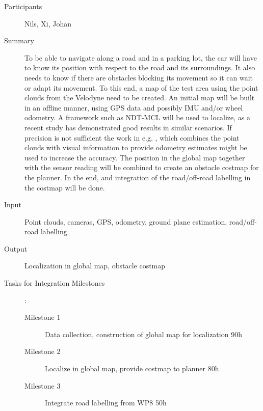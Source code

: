 \documentclass[11pt,a4paper]{article}
\begin{document}
\begin{description}
\item[Participants] Nils, Xi, Johan
\item[Summary] To be able to navigate along a road and in a parking lot, the car will have to know its 
			   position with respect to the road and its surroundings. It also needs to know if there
			   are obstacles blocking its movement so it can wait or adapt its movement.
			   To this end, a map of the test area using the point clouds from the
			   Velodyne need to be created. An initial map will be built in an offline manner, using GPS data and possibly
			   IMU and/or wheel odometry. A framework such as NDT-MCL \cite{saarinen2013normal} 
			   will be used to localize, as a recent study \cite{magnusson2015beyond} has demonstrated good results
			   in similar scenarios. If precision is not sufficient the work in e.g. \cite{Zhang_DEMO},
			   which combines the point clouds with visual information to provide odometry estimates might be used to increase the accuracy.
			   The position in the global map together
			   with the sensor reading will be combined to create an obstacle costmap for the planner.
			   In the end, and integration of the road/off-road labelling in the costmap will be done.
				
\item[Input] Point clouds, cameras, GPS, odometry, ground plane estimation, road/off-road labelling
\item[Output] Localization in global map, obstacle costmap
\item[Tasks for Integration Milestones]:\
	\begin{description}
		\item[Milestone 1] Data collection, construction of global map for localization 90h
		\item[Milestone 2] Localize in global map, provide costmap to planner 80h
		\item[Milestone 3] Integrate road labelling from WP8 50h
	\end{description}	 
\end{description}
\end{document}
